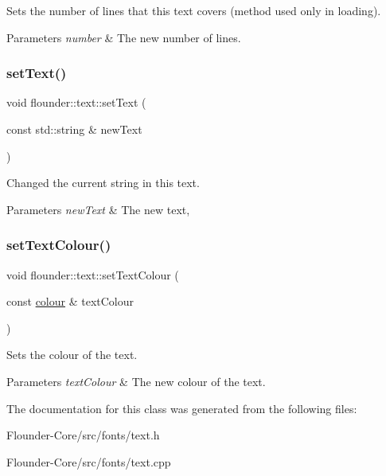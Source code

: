 Sets the number of lines that this text covers (method used only in loading). 


\begin{DoxyParams}{Parameters}
{\em number} & The new number of lines. \\
\hline
\end{DoxyParams}
\mbox{\label{classflounder_1_1text_a4afc45fc499ba1aef7977aee18e9ef66}} 
\subsubsection{\texorpdfstring{set\+Text()}{setText()}}
{\footnotesize\ttfamily void flounder\+::text\+::set\+Text (\begin{DoxyParamCaption}\item[{const std\+::string \&}]{new\+Text }\end{DoxyParamCaption})}



Changed the current string in this text. 


\begin{DoxyParams}{Parameters}
{\em new\+Text} & The new text, \\
\hline
\end{DoxyParams}
\mbox{\label{classflounder_1_1text_a8048287405568863030770812141f48d}} 
\subsubsection{\texorpdfstring{set\+Text\+Colour()}{setTextColour()}}
{\footnotesize\ttfamily void flounder\+::text\+::set\+Text\+Colour (\begin{DoxyParamCaption}\item[{const \hyperlink{classflounder_1_1colour}{colour} \&}]{text\+Colour }\end{DoxyParamCaption})\hspace{0.3cm}{\ttfamily [inline]}}



Sets the colour of the text. 


\begin{DoxyParams}{Parameters}
{\em text\+Colour} & The new colour of the text. \\
\hline
\end{DoxyParams}


The documentation for this class was generated from the following files\+:\begin{DoxyCompactItemize}
\item 
Flounder-\/\+Core/src/fonts/text.\+h\item 
Flounder-\/\+Core/src/fonts/text.\+cpp\end{DoxyCompactItemize}
